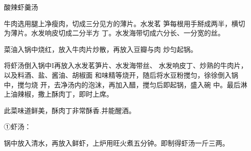 \begin{recipe}{酸辣虾羹汤}

\ingredients


\cooking

\step 牛肉选用腿上净瘦肉，切成三分见方的薄片。水发茗 笋每根用手掰成两半，横切为薄片。水发响皮切成二分半方 丁。水发海带切成六分长、一分宽的丝。

\step 菜油入锅中烧红，放入牛肉片炒散，再放入豆瓣与肉 炒匀起锅。

\step 将虾汤倒入锅中I再放入水发茗笋片、水发海带丝、 水发响皮丁、炒熟的牛肉片，以及料酒、盐、酱油、胡椒面 和味精等烧开，随后将水豆粉搅匀，徐徐倒入锅中，搅匀烧 开，去净汤内的泡沫，再加入醋，搅匀后即起锅，盛入碗 中。最后淋上油辣椒，撒上酥肉丁，即时上席。

\notes

此菜味道鲜美，酥肉丁非常酥香.并能醒酒。

①虾汤：

\ingredients


\cooking

锅中放入清水，再放入鲜虾，上炉用旺火煮五分钟。即制得虾汤一斤三两。

\end{recipe}


